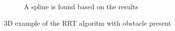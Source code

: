 \begin{figure}[htbp]
\begin{subfigure}[htbp]{0.45\textwidth}
        \caption{A spline is found based on the results}
        \label{fig:obav2}
    \end{subfigure}
    \caption{3D example of the RRT algoritm with obstacle present}
    \label{fig:obav}
\end{figure}
